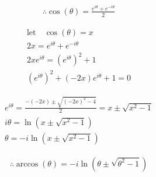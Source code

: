 \documentclass{../style}
\begin{document}
\euler

\begin{gather*}
	\therefore \cos(\theta) = \frac{e^{i\theta} + e^{-i\theta}}{2}
\end{gather*}

\begin{gather*}
	\text{let} \quad \cos(\theta) = x \\
	2x = e^{i\theta} + e^{-i\theta} \\
	2xe^{i\theta} = (e^{i\theta})^2 + 1 \\ 
	(e^{i\theta})^2 + (-2x)e^{i\theta} + 1 = 0
\end{gather*}

\begin{gather*}
	e^{i\theta} = \frac{-(-2x) \pm \sqrt{(-2x)^2 - 4}}{2} = x \pm \sqrt{x^2 - 1} \\
	i\theta = \ln(x \pm \sqrt{x^2 - 1}) \\
	\theta = -i\ln(x \pm \sqrt{x^2 - 1})
\end{gather*}

\begin{gather*}
	\therefore \arccos(\theta) = -i\ln(\theta \pm \sqrt{\theta^2 - 1})
\end{gather*}
\end{document}

